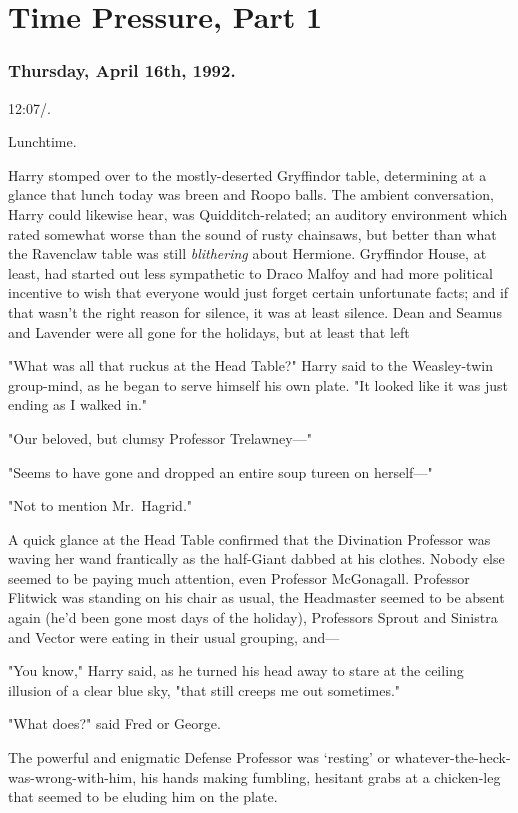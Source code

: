 \chapter{Time Pressure, Part 1}

\subsection{Thursday, April 16th, 1992.}

12:07\PM/.

Lunchtime.

Harry stomped over to the mostly-deserted Gryffindor table, determining at a
glance that lunch today was breen and Roopo balls. The ambient conversation,
Harry could likewise hear, was Quidditch-related; an auditory environment which
rated somewhat worse than the sound of rusty chainsaws, but better than what
the Ravenclaw table was still \emph{blithering} about Hermione. Gryffindor
House, at least, had started out less sympathetic to Draco Malfoy and had more
political incentive to wish that everyone would just forget certain unfortunate
facts; and if that wasn't the right reason for silence, it was at least
silence. Dean and Seamus and Lavender were all gone for the holidays, but at
least that left{\el}

"What was all that ruckus at the Head Table?" Harry said to the Weasley-twin
group-mind, as he began to serve himself his own plate. "It looked like it was
just ending as I walked in."

"Our beloved, but clumsy Professor Trelawney\mbox{---}"

"Seems to have gone and dropped an entire soup tureen on herself\mbox{---}"

"Not to mention Mr.~Hagrid."

A quick glance at the Head Table confirmed that the Divination Professor was
waving her wand frantically as the half-Giant dabbed at his clothes. Nobody
else seemed to be paying much attention, even Professor McGonagall. Professor
Flitwick was standing on his chair as usual, the Headmaster seemed to be absent
again (he'd been gone most days of the holiday), Professors Sprout and Sinistra
and Vector were eating in their usual grouping, and---

"You know," Harry said, as he turned his head away to stare at the ceiling
illusion of a clear blue sky, "that still creeps me out sometimes."

"What does?" said Fred or George.

The powerful and enigmatic Defense Professor was `resting' or
whatever-the-heck-was-wrong-with-him, his hands making fumbling, hesitant grabs
at a chicken-leg that seemed to be eluding him on the plate.

